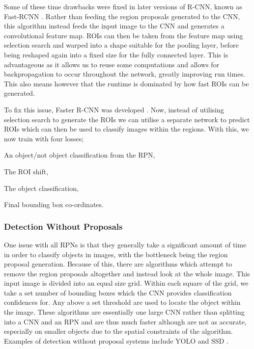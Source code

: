 Some of these time drawbacks were fixed in later versions of R-CNN, known as Fast-RCNN \cite{girshick_fast_2015}. Rather than feeding the region proposals generated to the CNN, this algorithm instead feeds the input image to the CNN and generates a convolutional feature map. ROIs can then be taken from the feature map using selection search and warped into a shape suitable for the pooling layer, before being reshaped again into a fixed size for the fully connected layer. This is advantageous as it allows us to reuse some computations and allows for backpropagation to occur throughout the network, greatly improving run times.  This also means however that the runtime is dominated by how fast ROIs can be generated. 

To fix this issue, Faster R-CNN was developed \cite{ren_faster_2015}. Now, instead of utilising selection search to generate the ROIs we can utilise a separate network to predict ROIs which can then be used to classify images within the regions. With this, we now train with four losses; 

\begin{enumerate*}
	\item An object/not object classification from the RPN,
	\item The ROI shift,
	\item The object classification,
	\item Final bounding box co-ordinates.
\end{enumerate*}

\subsubsection{Detection Without Proposals}\label{ch:Background,sec:objectDetection,sub:noProposals}

One issue with all RPNs is that they generally take a significant amount of time in order to classify objects in images, with the bottleneck being the region proposal generation. Because of this, there are algorithms which attempt to remove the region proposals altogether and instead look at the whole image. This input image is divided into an equal size grid. Within each square of the grid, we take a set number of bounding boxes which the CNN provides classification confidences for. Any above a set threshold are used to locate the object within the image. These algorithms are essentially one large CNN rather than splitting into a CNN and an RPN and are thus much faster although are not as accurate, especially on smaller objects due to the spatial constraints of the algorithm. Examples of detection without proposal systems include YOLO \cite{redmon_you_2016} and SSD \cite{liu_ssd:_2016}. 


